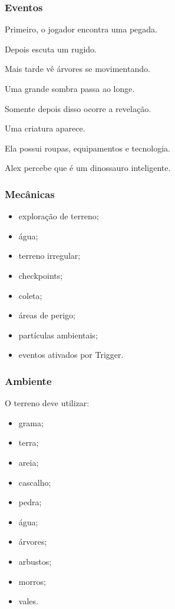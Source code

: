 \documentclass[12pt,a4paper]{article}
\begin{document}
\subsubsection*{Eventos}

Primeiro, o jogador encontra uma pegada.

Depois escuta um rugido.

Mais tarde vê árvores se movimentando.

Uma grande sombra passa ao longe.

Somente depois disso ocorre a revelação.

Uma criatura aparece.

Ela possui roupas, equipamentos e tecnologia.

Alex percebe que é um dinossauro inteligente.

\subsubsection*{Mecânicas}

\begin{itemize}
    \item exploração de terreno;
    \item água;
    \item terreno irregular;
    \item checkpoints;
    \item coleta;
    \item áreas de perigo;
    \item partículas ambientais;
    \item eventos ativados por Trigger.
\end{itemize}

\subsubsection*{Ambiente}

O terreno deve utilizar:

\begin{itemize}
    \item grama;
    \item terra;
    \item areia;
    \item cascalho;
    \item pedra;
    \item água;
    \item árvores;
    \item arbustos;
    \item morros;
    \item vales.
\end{itemize}
\end{document}
